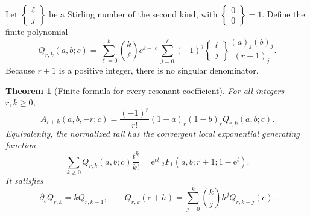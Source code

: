 \documentclass[11pt]{article}
\numberwithin{equation}{section}
\newtheorem{theorem}{Theorem}[section]
\theoremstyle{definition}\newtheorem{definition}[theorem]{Definition}
\theoremstyle{remark}\newtheorem{remark}[theorem]{Remark}
\newcommand{\e}{\mathrm e}
\newcommand{\stirling}[2]{\left\{\begin{matrix}#1\\#2\end{matrix}\right\}}
\begin{document}
Let $\stirling{\ell}{j}$ be a Stirling number of the second kind, with
$\stirling00=1$. Define the finite polynomial
\begin{equation}\label{agrc:Q-definition}
 Q_{r,k}(a,b;c)=\sum_{\ell=0}^k\binom{k}{\ell}c^{k-\ell}
       \sum_{j=0}^{\ell}(-1)^j\stirling{\ell}{j}
                 \frac{(a)_j(b)_j}{(r+1)_j}.
\end{equation}
Because $r+1$ is a positive integer, there is no singular denominator.

\begin{theorem}[Finite formula for every resonant coefficient]
\label{agrc:tail}
For all integers $r,k\geq0$,
\begin{equation}\label{agrc:tail-formula}
 \boxed{\displaystyle
 A_{r+k}(a,b,-r;c)=
 \frac{(-1)^r}{r!}(1-a)_r(1-b)_r Q_{r,k}(a,b;c).}
\end{equation}
Equivalently, the normalized tail has the convergent local exponential
 generating function
\begin{equation}\label{agrc:tail-hypergeometric}
 \sum_{k\geq0}Q_{r,k}(a,b;c)\frac{t^k}{k!}
       =\e^{ct}\,{}_2F_1(a,b;r+1;1-\e^t).
\end{equation}
It satisfies
\begin{equation}\label{agrc:Appell}
 \partial_c Q_{r,k}=kQ_{r,k-1},\qquad
 Q_{r,k}(c+h)=\sum_{j=0}^k\binom{k}{j}h^jQ_{r,k-j}(c).
\end{equation}
\end{theorem}
\end{document}

